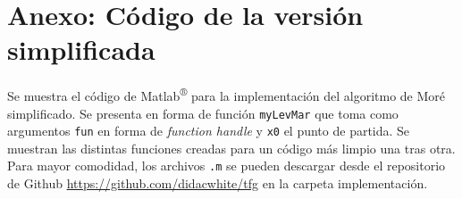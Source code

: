 \documentclass[11pt,a4paper]{book}
\theoremstyle{definition}
\theoremstyle{remark}
\def\code#1{\texttt{#1}}
\begin{document}
\appendix
\renewcommand{\thechapter}{\Roman{chapter}}
\chapter{Anexo: Código de la versión simplificada}\label{chap:impl-simpl}
Se muestra el código de Matlab\textsuperscript{®} para la implementación del algoritmo de Moré simplificado. Se presenta en forma de función \code{myLevMar} que toma como argumentos \code{fun} en forma de \textit{function handle} y \code{x0} el punto de partida. Se muestran las distintas funciones creadas para un código más limpio una tras otra. Para mayor comodidad, los archivos \code{.m} se pueden descargar desde el repositorio de Github \url{https://github.com/didacwhite/tfg} en la carpeta implementación.
\vspace{10pt}













\backmatter


%




\end{document}
